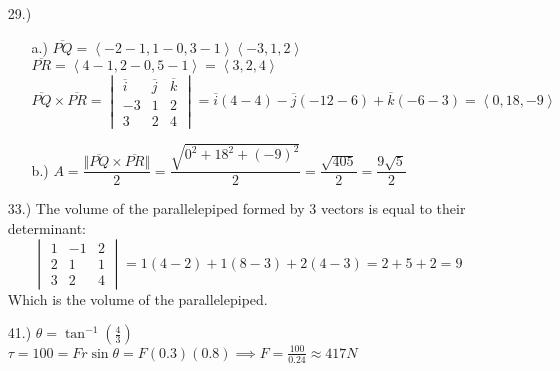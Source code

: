 \documentclass[12pt]{article}
\newcommand{\angleb}[1]{\left\langle#1\right\rangle}
\begin{document}
\begin{itemize}
	\item [29.)] \begin{itemize}
		      \item [a.)] $\overline{PQ}=\angleb{-2-1,1-0,3-1}\angleb{-3,1,2}$\newline
		            $\overline{PR}=\angleb{4-1,2-0,5-1}=\angleb{3,2,4}$\newline
		            $\overline{PQ}\times\overline{PR}=\begin{vmatrix}
				            \overline{i} & \overline{j} & \overline{k} \\
				            -3           & 1            & 2            \\3 & 2 & 4
			            \end{vmatrix}=\overline{i}(4-4)-\overline{j}(-12-6)+\overline{k}(-6-3)=\angleb{0,18,-9}$

		      \item [b.)] $A=\dfrac{\Vert\overline{PQ}\times\overline{PR}\Vert}{2}=\dfrac{\sqrt{0^2+18^2+(-9)^2}}{2}=\dfrac{\sqrt{405}}{2}=\dfrac{9\sqrt{5}}{2}$
	      \end{itemize}

	\item [33.)] The volume of the parallelepiped formed by 3 vectors is equal to their determinant:
	      \[\begin{vmatrix}
			      1 & -1 & 2 \\
			      2 & 1  & 1 \\
			      3 & 2  & 4
		      \end{vmatrix}=1(4-2)+1(8-3)+2(4-3)=2+5+2=9\]
	      Which is the volume of the parallelepiped.

	\item [41.)] $\theta=\tan^{-1}\left(\frac{4}{3}\right)$\newline
	      $\tau=100=Fr\sin\theta=F(0.3)(0.8)\implies F=\frac{100}{0.24}\approx417N$
\end{itemize}
\end{document}
